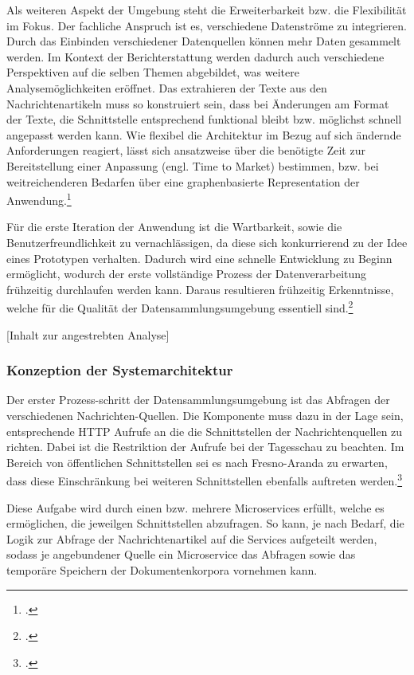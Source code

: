 Als weiteren Aspekt der Umgebung steht die Erweiterbarkeit bzw. die Flexibilität im Fokus. Der fachliche Anspruch ist es, verschiedene Datenströme zu integrieren. Durch das Einbinden verschiedener Datenquellen können mehr Daten gesammelt werden. Im Kontext der Berichterstattung werden dadurch auch verschiedene Perspektiven auf die selben Themen abgebildet, was weitere Analysemöglichkeiten eröffnet. Das extrahieren der Texte aus den Nachrichtenartikeln muss so konstruiert sein, dass  bei Änderungen am Format der Texte, die Schnittstelle entsprechend funktional bleibt bzw. möglichst schnell angepasst werden kann. Wie flexibel die Architektur im Bezug auf sich ändernde Anforderungen reagiert, lässt sich ansatzweise über die benötigte Zeit zur Bereitstellung einer Anpassung (engl. Time to Market) bestimmen, bzw. bei weitreichenderen Bedarfen über eine graphenbasierte Representation der Anwendung.\footcite[Vgl.][]{Broniatowski.Measuring.2016}{}{}

Für die erste Iteration der Anwendung ist die Wartbarkeit, sowie die Benutzerfreundlichkeit zu vernachlässigen, da diese sich konkurrierend zu der Idee eines Prototypen verhalten. Dadurch wird eine schnelle Entwicklung zu Beginn ermöglicht, wodurch der erste vollständige Prozess der Datenverarbeitung frühzeitig durchlaufen werden kann. Daraus resultieren frühzeitig Erkenntnisse, welche für die Qualität der Datensammlungsumgebung essentiell sind.\footcite[Vgl.][]{Strang.Mining.2023}{}{}

[Inhalt zur angestrebten Analyse]

\subsubsection{Konzeption der Systemarchitektur}
Der erster Prozess-schritt der Datensammlungsumgebung ist das Abfragen der verschiedenen Nachrichten-Quellen. Die Komponente muss dazu in der Lage sein, entsprechende HTTP Aufrufe an die die Schnittstellen der Nachrichtenquellen zu richten. Dabei ist die Restriktion der Aufrufe bei der Tagesschau zu beachten. Im Bereich von öffentlichen Schnittstellen sei es nach Fresno-Aranda zu erwarten, dass diese Einschränkung bei weiteren Schnittstellen ebenfalls auftreten werden.\footcite[Vgl.][]{Fresno-Aranda.Automated.2022}{}{}

Diese Aufgabe wird durch einen  bzw. mehrere  Microservices erfüllt, welche es ermöglichen, die jeweilgen Schnittstellen abzufragen.  So kann, je nach Bedarf, die Logik zur Abfrage der Nachrichtenartikel auf die Services aufgeteilt werden, sodass je angebundener Quelle ein Microservice das Abfragen sowie das temporäre Speichern der Dokumentenkorpora vornehmen kann. 

